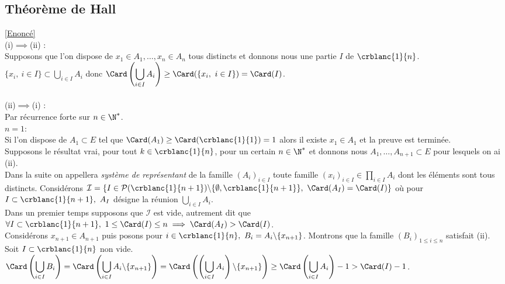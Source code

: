 \documentclass[8pt]{book}
\begin{document}
	\subsection{Théorème de Hall }
		\textcolor{blue}{\hyperref[Théorème de Hall]{[Enoncé]}}\\
	\label{Théorème de Hall corrigé}
	(i)$\implies$(ii) :\\
	Supposons que l'on dispose de $x_1\in A_1,\dots,x_n\in A_n$ tous distincts et donnons nous une partie $I$ de $\crblanc{1}{n}$.\\
	$\{x_i,\ i\in I\}\subset \displaystyle\bigcup_{i\in I}A_i$ donc $\displaystyle\Card\left(\bigcup_{i\in I}A_i\right)\geq \Card(\{x_i,\ i\in I\})=\Card(I)$.\\\\
	(ii)$\implies$(i) :\\
	Par récurrence forte sur $n\in \N^*$.\\
	$n=1$:\\
	Si l'on dispose de $A_1\subset E$ tel que $\Card(A_1)\geq \Card(\crblanc{1}{1})=1$ alors il existe $x_1\in A_1$ et la preuve est terminée.\\
	Supposons le résultat vrai, pour tout $k\in \crblanc{1}{n}$, pour un certain $n\in \N^*$ et donnons nous $A_1,\dots,A_{n+1}\subset E$ pour lesquels on ai (ii).\\
	Dans la suite on appellera \textit{système de représentant} de la famille $(A_i)_{i\in I}$ toute famille $(x_i)_{i\in I}\in \displaystyle\prod_{i\in I}A_i$ dont les éléments sont tous distincts. Considérons $\mathcal I=\{I\in\mathcal P(\crblanc{1}{n+1})\backslash\{\emptyset,\crblanc{1}{n+1}\},\ \Card(A_I)=\Card(I)\}$ où pour $I\subset \crblanc{1}{n+1},\ A_I$ désigne la réunion $\displaystyle\bigcup_{i\in I}A_i$.\\
	Dans un premier temps supposons que $\mathcal I$ est vide, autrement dit que $\forall I\subset \crblanc{1}{n+1},\ 1\leq\Card(I)\leq n\implies \Card(A_I)>\Card(I)$.\\
	Considérons $x_{n+1}\in A_{n+1}$ puis posons pour $i\in \crblanc{1}{n},\ B_i=A_i\backslash\{x_{n+1}\}$. Montrons que la famille $(B_i)_{1\leq i\leq n}$ satisfait (ii).\\
	Soit $I\subset \crblanc{1}{n}$ non vide.\\
	$\displaystyle\Card\left(\bigcup_{i\in I}B_i\right)=\Card\left(\bigcup_{i\in I}A_i\backslash\{x_{n+1}\}\right)=\Card\left(\left(\bigcup_{i\in I}A_i\right)\backslash\{x_{n+1}\}\right)\geq \Card\left(\bigcup_{i\in I}A_i\right)-1>\Card(I)-1$.\\
\end{document}

